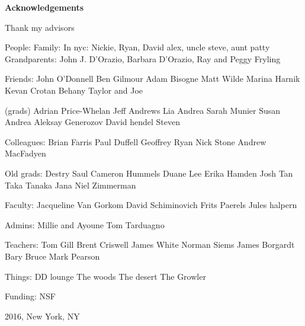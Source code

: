 \newpage

\begin{center}
    {\large \bf Acknowledgements }
\end{center}

\vspace{-0.2cm}

Thank my advisors





People:
Family:
In nyc: Nickie, Ryan, David
alex, uncle steve, aunt patty
Grandparents: John J. D'Orazio, Barbara D'Orazio, Ray and Peggy Fryling

Friends:
John O'Donnell
Ben Gilmour
Adam Bisogne
Matt Wilde
Marina Harnik
Kevan Crotan
Behany Taylor and Joe

(grads)
Adrian Price-Whelan
Jeff Andrews
Lia 
Andrea
Sarah
Munier
Susan
Andrea
Aleksay Generozov
David hendel
Steven


Colleagues:
Brian Farris
Paul Duffell
Geoffrey Ryan
Nick Stone
Andrew MacFadyen

Old grads:
Destry Saul
Cameron Hummels
Duane Lee
Erika Hamden
Josh Tan
Taka Tanaka
Jana Niel Zimmerman

Faculty:
Jacqueline Van Gorkom
David Schiminovich
Frits Paerels
Jules halpern

Admins:
Millie and Ayoune
Tom Tarduagno

Teachers:
Tom Gill
Brent Criswell
James White 
Norman Siems
James Borgardt
Bary Bruce
Mark Pearson


Things:
DD lounge
The woods 
The desert
The Growler

Funding:
NSF

\vspace{1.8cm}
2016, New York, NY

